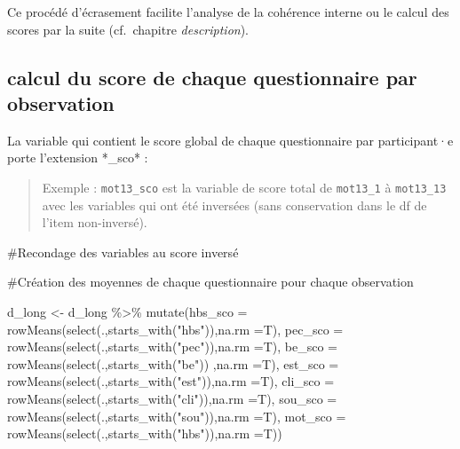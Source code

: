 \documentclass[
  letterpaper,
  DIV=11,
  numbers=noendperiod]{scrreprt}
\newenvironment{Shaded}{\begin{snugshade}}{\end{snugshade}}
\newcommand{\AttributeTok}[1]{\textcolor[rgb]{0.40,0.45,0.13}{#1}}
\newcommand{\CommentTok}[1]{\textcolor[rgb]{0.37,0.37,0.37}{#1}}
\newcommand{\FunctionTok}[1]{\textcolor[rgb]{0.28,0.35,0.67}{#1}}
\newcommand{\NormalTok}[1]{\textcolor[rgb]{0.00,0.23,0.31}{#1}}
\newcommand{\OtherTok}[1]{\textcolor[rgb]{0.00,0.23,0.31}{#1}}
\newcommand{\SpecialCharTok}[1]{\textcolor[rgb]{0.37,0.37,0.37}{#1}}
\newcommand{\StringTok}[1]{\textcolor[rgb]{0.13,0.47,0.30}{#1}}
\begin{document}
Ce procédé d'écrasement facilite l'analyse de la cohérence interne ou le
calcul des scores par la suite (cf.~chapitre \emph{description}).

\hypertarget{calcul-du-score-de-chaque-questionnaire-par-observation}{%
\subsection{calcul du score de chaque questionnaire par
observation}\label{calcul-du-score-de-chaque-questionnaire-par-observation}}

La variable qui contient le score global de chaque questionnaire par
participant·e porte l'extension *\_sco* :

\begin{quote}
Exemple : \texttt{mot13\_sco} est la variable de score total de
\texttt{mot13\_1} à \texttt{mot13\_13} avec les variables qui ont été
inversées (sans conservation dans le df de l'item non-inversé).
\end{quote}

\begin{Shaded}
\begin{Highlighting}[]
\CommentTok{\#Recondage des variables au score inversé}

\CommentTok{\#Création des moyennes de chaque questionnaire pour chaque observation}

\NormalTok{d\_long }\OtherTok{\textless{}{-}}\NormalTok{ d\_long }\SpecialCharTok{\%\textgreater{}\%} 
  \FunctionTok{mutate}\NormalTok{(}\AttributeTok{hbs\_sco =} \FunctionTok{rowMeans}\NormalTok{(}\FunctionTok{select}\NormalTok{(.,}\FunctionTok{starts\_with}\NormalTok{(}\StringTok{"hbs"}\NormalTok{)),}\AttributeTok{na.rm =}\NormalTok{T),}
         \AttributeTok{pec\_sco =} \FunctionTok{rowMeans}\NormalTok{(}\FunctionTok{select}\NormalTok{(.,}\FunctionTok{starts\_with}\NormalTok{(}\StringTok{"pec"}\NormalTok{)),}\AttributeTok{na.rm =}\NormalTok{T),}
         \AttributeTok{be\_sco  =} \FunctionTok{rowMeans}\NormalTok{(}\FunctionTok{select}\NormalTok{(.,}\FunctionTok{starts\_with}\NormalTok{(}\StringTok{"be"}\NormalTok{)) ,}\AttributeTok{na.rm =}\NormalTok{T),}
         \AttributeTok{est\_sco =} \FunctionTok{rowMeans}\NormalTok{(}\FunctionTok{select}\NormalTok{(.,}\FunctionTok{starts\_with}\NormalTok{(}\StringTok{"est"}\NormalTok{)),}\AttributeTok{na.rm =}\NormalTok{T),}
         \AttributeTok{cli\_sco =} \FunctionTok{rowMeans}\NormalTok{(}\FunctionTok{select}\NormalTok{(.,}\FunctionTok{starts\_with}\NormalTok{(}\StringTok{"cli"}\NormalTok{)),}\AttributeTok{na.rm =}\NormalTok{T),}
         \AttributeTok{sou\_sco =} \FunctionTok{rowMeans}\NormalTok{(}\FunctionTok{select}\NormalTok{(.,}\FunctionTok{starts\_with}\NormalTok{(}\StringTok{"sou"}\NormalTok{)),}\AttributeTok{na.rm =}\NormalTok{T),}
         \AttributeTok{mot\_sco =} \FunctionTok{rowMeans}\NormalTok{(}\FunctionTok{select}\NormalTok{(.,}\FunctionTok{starts\_with}\NormalTok{(}\StringTok{"hbs"}\NormalTok{)),}\AttributeTok{na.rm =}\NormalTok{T))}
\end{Highlighting}
\end{Shaded}
\end{document}
